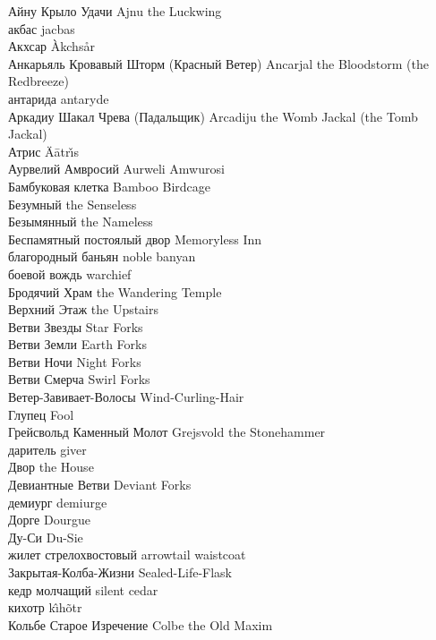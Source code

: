 Айну Крыло Удачи \hfill Ajnu the Luckwing\\
акбас \hfill jacbas\\
Акхсар \hfill \`{A}kchs\r{a}r\\
Анкарьяль Кровавый Шторм (Красный Ветер) \hfill Ancarjal the Bloodstorm (the Redbreeze)\\
антарида \hfill antaryde\\
Аркадиу Шакал Чрева (Падальщик) \hfill Arcadiju the Womb Jackal (the Tomb Jackal)\\
Атрис \hfill \"{A}\={a}tr\v{\i}s\\
Аурвелий Амвросий \hfill Aurweli Amwurosi\\
Бамбуковая клетка \hfill Bamboo Birdcage\\
Безумный \hfill the Senseless\\
Безымянный \hfill the Nameless\\
Беспамятный постоялый двор \hfill Memoryless Inn\\
благородный баньян \hfill noble banyan\\
боевой вождь \hfill warchief\\
Бродячий Храм \hfill the Wandering Temple\\
Верхний Этаж \hfill the Upstairs\\
Ветви Звезды \hfill Star Forks\\
Ветви Земли \hfill Earth Forks\\
Ветви Ночи \hfill Night Forks\\
Ветви Смерча \hfill Swirl Forks\\
Ветер-Завивает-Волосы \hfill Wind-Curling-Hair\\
Глупец \hfill Fool\\
Грейсвольд Каменный Молот \hfill Grejsvold the Stonehammer\\
даритель \hfill giver\\
Двор \hfill the House\\
Девиантные Ветви \hfill Deviant Forks\\
демиург \hfill demiurge\\
Дорге \hfill Dourgue\\
Ду-Си \hfill Du-Sie\\
жилет стрелохвостовый \hfill arrowtail waistcoat\\
Закрытая-Колба-Жизни \hfill Sealed-Life-Flask\\
кедр молчащий \hfill silent cedar\\
кихотр \hfill k\^{\i}h\~{o}tr\\
Кольбе Старое Изречение \hfill Colbe the Old Maxim\\
